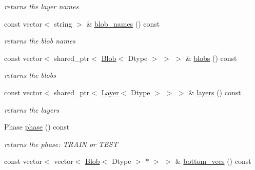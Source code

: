\begin{DoxyCompactItemize}
\begin{DoxyCompactList}\small\item\em returns the layer names \end{DoxyCompactList}\item 
\mbox{\label{classcaffe_1_1_net_aeaf1e942f1552b9c48bd9e834ede20e6}} 
const vector$<$ string $>$ \& \mbox{\hyperlink{classcaffe_1_1_net_aeaf1e942f1552b9c48bd9e834ede20e6}{blob\+\_\+names}} () const
\begin{DoxyCompactList}\small\item\em returns the blob names \end{DoxyCompactList}\item 
\mbox{\label{classcaffe_1_1_net_ab64573aa9187fb7540825d9338807a79}} 
const vector$<$ shared\+\_\+ptr$<$ \mbox{\hyperlink{classcaffe_1_1_blob}{Blob}}$<$ Dtype $>$ $>$ $>$ \& \mbox{\hyperlink{classcaffe_1_1_net_ab64573aa9187fb7540825d9338807a79}{blobs}} () const
\begin{DoxyCompactList}\small\item\em returns the blobs \end{DoxyCompactList}\item 
\mbox{\label{classcaffe_1_1_net_a174e8bb96b67f423f8c405dac2334a5a}} 
const vector$<$ shared\+\_\+ptr$<$ \mbox{\hyperlink{classcaffe_1_1_layer}{Layer}}$<$ Dtype $>$ $>$ $>$ \& \mbox{\hyperlink{classcaffe_1_1_net_a174e8bb96b67f423f8c405dac2334a5a}{layers}} () const
\begin{DoxyCompactList}\small\item\em returns the layers \end{DoxyCompactList}\item 
\mbox{\label{classcaffe_1_1_net_a9418aee447ff6e847fd1a5e7be3d7a44}} 
Phase \mbox{\hyperlink{classcaffe_1_1_net_a9418aee447ff6e847fd1a5e7be3d7a44}{phase}} () const
\begin{DoxyCompactList}\small\item\em returns the phase\+: T\+R\+A\+IN or T\+E\+ST \end{DoxyCompactList}\item 
\mbox{\label{classcaffe_1_1_net_a25c25c31ddf7a78c7dfded318798764c}} 
const vector$<$ vector$<$ \mbox{\hyperlink{classcaffe_1_1_blob}{Blob}}$<$ Dtype $>$ $\ast$ $>$ $>$ \& \mbox{\hyperlink{classcaffe_1_1_net_a25c25c31ddf7a78c7dfded318798764c}{bottom\+\_\+vecs}} () const

\end{DoxyCompactItemize}
